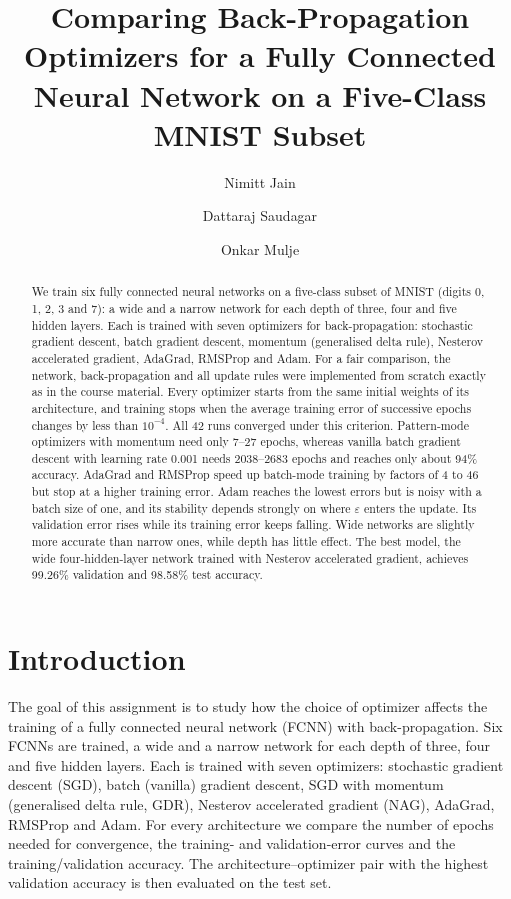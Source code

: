 \documentclass[runningheads]{llncs}
\begin{document}
%
\title{Comparing Back-Propagation Optimizers for a Fully Connected Neural Network on a Five-Class MNIST Subset}
%
\author{Nimitt Jain \and Dattaraj Saudagar \and Onkar Mulje}
%
\maketitle
%
\begin{abstract}
We train six fully connected neural networks on a five-class subset of MNIST (digits 0, 1, 2, 3
and 7): a wide and a narrow network for each depth of three, four and five hidden layers. Each is
trained with seven optimizers for back-propagation: stochastic gradient descent, batch gradient
descent, momentum (generalised delta rule), Nesterov accelerated gradient, AdaGrad, RMSProp and Adam.
For a fair comparison, the network, back-propagation and all update rules were implemented from
scratch exactly as in the course material. Every optimizer starts from the same initial weights of
its architecture, and training stops when the average training error of successive epochs changes by
less than $10^{-4}$. All 42 runs converged under this criterion. Pattern-mode optimizers with
momentum need only 7--27 epochs, whereas vanilla batch gradient descent with learning rate 0.001 needs
2038--2683 epochs and reaches only about 94\% accuracy. AdaGrad and RMSProp speed up batch-mode
training by factors of 4 to 46 but stop at a higher training error. Adam reaches the lowest errors
but is noisy with a batch size of one, and its stability depends strongly on where $\varepsilon$
enters the update. Its validation error rises while its training error keeps falling. Wide networks
are slightly more accurate than narrow ones, while depth has little effect. The best model, the wide
four-hidden-layer network trained with Nesterov accelerated gradient, achieves 99.26\% validation and
98.58\% test accuracy.
\end{abstract}

\section{Introduction}
The goal of this assignment is to study how the choice of optimizer affects the training of a
fully connected neural network (FCNN) with back-propagation. Six FCNNs are trained, a wide and a
narrow network for each depth of three, four and five hidden layers. Each is trained with seven
optimizers: stochastic gradient descent (SGD), batch
(vanilla) gradient descent, SGD with momentum (generalised delta rule, GDR), Nesterov accelerated
gradient (NAG), AdaGrad, RMSProp and Adam. For every architecture we compare the number of epochs
needed for convergence, the training- and validation-error curves and the training/validation
accuracy. The architecture--optimizer pair with the highest validation accuracy is then evaluated on
the test set.
\end{document}
